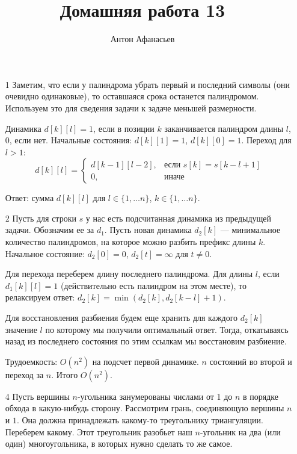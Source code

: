 \documentclass[10pt]{article}
\begin{document}
\title{Домашняя работа 13}
\author{Антон Афанасьев}
\maketitle

\begin{enumerate}

\item[1] Заметим, что если у палиндрома убрать первый и последний символы (они очевидно одинаковые), то оставшаяся срока останется палиндромом. Используем это для сведения задачи к задаче меньшей размерности.

Динамика $d[k][l] = 1$, если в позиции $k$ заканчивается палиндром длины $l$, $0$, если нет. Начальные состояния: $d[k][1] = 1$, $d[k][0]=1$. Переход для $l > 1$:
$$d[k][l] = \begin{cases}
d[k-1][l-2],&\text{если }s[k]=s[k-l+1]\\
0,&\text{иначе}
\end{cases}
$$

Ответ: сумма $d[k][l]$ для $l \in \{1, \ldots n\}$, $k \in \{1, \ldots n\}$. 

\item[2] Пусть для строки $s$ у нас есть подсчитанная динамика из предыдущей задачи. Обозначим ее за $d_1$. Пусть новая динамика $d_2[k]$ --- минимальное количество палиндромов, на которое можно разбить префикс длины $k$. Начальное состояние: $d_2[0]=0$, $d_2[t]=\infty$ для $t \not = 0$. 

Для перехода переберем длину последнего палиндрома. Для длины $l$, если $d_1[k][l] = 1$ (действительно есть палиндром на этом месте), то релаксируем ответ: $d_2[k] = \min(d_2[k], d_2[k-l]+1)$. 

Для восстановления разбиения будем еще хранить для каждого $d_2[k]$ значение $l$ по которому мы получили оптимальный ответ. Тогда, откатываясь назад из последнего состояния по этим ссылкам мы восстановим разбиение.

Трудоемкость: $O(n^2)$ на подсчет первой динамике. $n$ состояний во второй и переход за $n$. Итого $O(n^2)$.

\item[4] Пусть вершины $n$-угольника занумерованы числами от 1 до $n$ в порядке обхода в какую-нибудь сторону. Рассмотрим грань, соединяющую вершины $n$ и $1$. Она должна принадлежать какому-то треугольнику триангуляции. Переберем какому. Этот треугольник разобьет наш $n$-угольник на два (или один) многоугольника, в которых нужно сделать то же самое.


\end{enumerate}
\end{document}
